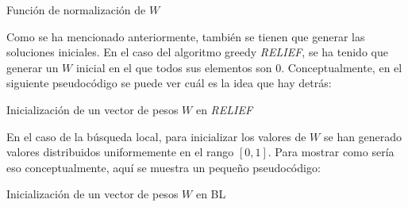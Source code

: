 \documentclass[11pt,a4paper]{article}
\begin{document}
\begin{algorithm}[H]
\caption{Función de normalización de $W$}

\end{algorithm}

Como se ha mencionado anteriormente, también se tienen que generar las soluciones iniciales. En el caso del algoritmo greedy
\textit{RELIEF}, se ha tenido que generar un $W$ inicial en el que todos sus elementos son 0. Conceptualmente, en el siguiente
pseudocódigo se puede ver cuál es la idea que hay detrás:

\begin{algorithm}[H]
\caption{Inicialización de un vector de pesos $W$ en \textit{RELIEF}}

\end{algorithm}

En el caso de la búsqueda local, para inicializar los valores de $W$ se han generado valores distribuidos uniformemente en
el rango $[0, 1]$. Para mostrar como sería eso conceptualmente, aquí se muestra un pequeño pseudocódigo:

\begin{algorithm}[H]
\caption{Inicialización de un vector de pesos $W$ en BL}


\end{algorithm}
\end{document}
